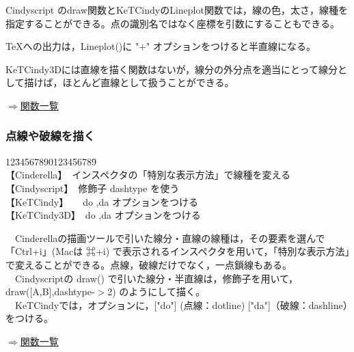 \documentclass[papersize,a4paper,12pt,uplatex]{jsarticle}
\begin{document}
Cindyscript のdraw関数とKeTCindyのLineplot関数では，線の色，太さ，線種を指定することができる。点の識別名ではなく座標を引数にすることもできる。

TeXへの出力は，Lineplot()に "+" オプションをつけると半直線になる。

KeTCindy3Dには直線を描く関数はないが，線分の外分点を適当にとって線分として描けば，ほとんど直線として扱うことができる。
\begin{flushright} \hyperlink{functionlist3d}{$\Rightarrow$関数一覧}\end{flushright}



\subsubsection{点線や破線を描く}

\begin{tabbing}
12\=34567890123456789\=\kill\\

\>【Cinderella】　\>インスペクタの「特別な表示方法」で線種を変える　\\ 
\>【Cindyscript】　\>修飾子 dashtype を使う　\\
 \>【KeTCindy】　　\>do ,da オプションをつける\\
 \>【KeTCindy3D】　\>do ,da オプションをつける\\
\end{tabbing}
　Cinderellaの描画ツールで引いた線分・直線の線種は，その要素を選んで「Ctrl+i」(Macは ⌘+i) で表示されるインスペクタを用いて，「特別な表示方法」で変えることができる。点線，破線だけでなく，一点鎖線もある。\\
　Cindyscriptの draw() で引いた線分・半直線は，修飾子を用いて， draw([A,B],dashtype-$>$2) のようにして描く。\\
　KeTCindyでは，オプションに，["do"] (点線：dotline) ["da"]（破線：dashline）をつける。
\begin{flushright} \hyperlink{functionlist3d}{$\Rightarrow$関数一覧}\end{flushright}
\end{document}
